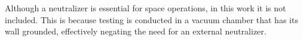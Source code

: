 Although a neutralizer is essential for space operations, in this work it is not included. This is because testing is conducted in a vacuum chamber that has its wall grounded, effectively
negating the need for an external neutralizer. 











